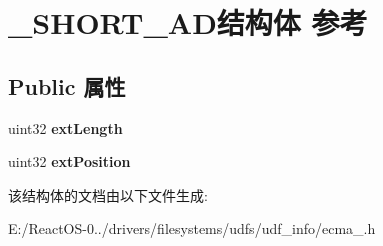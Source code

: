 \hypertarget{struct___s_h_o_r_t___a_d}{}\section{\+\_\+\+S\+H\+O\+R\+T\+\_\+\+A\+D结构体 参考}
\label{struct___s_h_o_r_t___a_d}
\subsection*{Public 属性}
\begin{DoxyCompactItemize}
\item 
\mbox{\label{struct___s_h_o_r_t___a_d_a270f1eec31f62505e1c9b3bf89b2406a}} 
uint32 {\bfseries ext\+Length}
\item 
\mbox{\label{struct___s_h_o_r_t___a_d_aadae334c6cb686049197d6732fe6d416}} 
uint32 {\bfseries ext\+Position}
\end{DoxyCompactItemize}


该结构体的文档由以下文件生成\+:\begin{DoxyCompactItemize}
\item 
E\+:/\+React\+O\+S-\/0../drivers/filesystems/udfs/udf\+\_\+info/ecma\+\_.\+h\end{DoxyCompactItemize}
